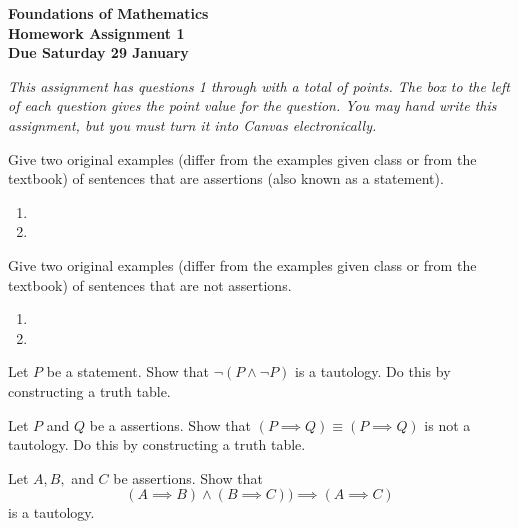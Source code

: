 \documentclass[12pt,fleqn]{exam}
\begin{document}
\large
\begin{flushleft}
{\bf 
Foundations of Mathematics \\
Homework Assignment 1 \\
Due Saturday 29 January \the\year}
\end{flushleft}

\noindent \emph{This assignment has questions 1 through \numquestions \/ with a total
of \numpoints\/ points.  The box to the left of each question gives the point value for the question. You may hand write this assignment, but you must turn it into Canvas electronically. }




\begin{questions}

\question [2] Give two original examples (differ from the examples given class or from the textbook) of sentences that are  assertions (also known as a statement).
\begin{solution}
  
  \begin{enumerate}
     \item 
     \item 
  \end{enumerate}
\end{solution}
\question [2]  Give two original examples (differ from the examples given class or from the textbook) of sentences that are not assertions.
\begin{solution}
    \begin{enumerate}
     \item 
     \item 
  \end{enumerate}
\end{solution}
\question [2] Let \(P\) be a statement.  Show that \(\lnot (P \land \lnot P)\) is a tautology. Do this by constructing a truth table.
\begin{solution} 


\end{solution}

\question [2] Let \(P\) and \(Q\) be a assertions.  Show that \( (P \implies Q) \equiv (P \implies Q) \)  is not a tautology. Do this by constructing a truth table.

\question  [2] Let $A,B,$ and $C$ be assertions. Show that 
\[ ( A \implies B)\land (B\implies C)) \implies (A \implies C) 
\]
 is a tautology.

\end{questions}
\end{document}
